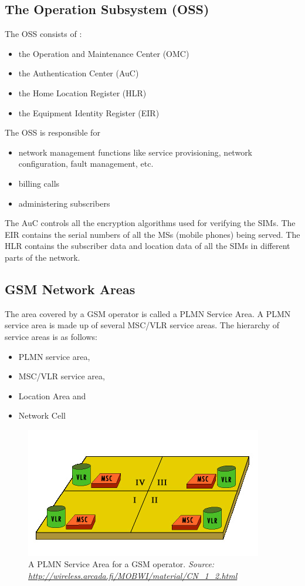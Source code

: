 \subsection{The Operation Subsystem (OSS)}

The OSS consists of :
\begin{itemize}
\item the Operation and Maintenance Center (OMC)
\item the Authentication Center (AuC)
\item the Home Location Register (HLR)
\item the Equipment Identity Register (EIR)
\end{itemize}

The OSS is responsible for
\begin{itemize}
\item network management functions like service provisioning, network configuration, fault management, etc.
\item billing calls
\item administering subscribers
\end{itemize}

The AuC controls all the encryption algorithms used for verifying the SIMs. The EIR contains the serial numbers of all the MSs (mobile phones) being served. The HLR contains the subscriber data and location data of all the SIMs in different parts of the network.

\subsection{GSM Network Areas}

The area covered by a GSM operator is called a PLMN Service Area. A PLMN service area is made up of several MSC/VLR service areas. The hierarchy of service areas is as follows:
\begin{itemize}
\item PLMN service area,
\item MSC/VLR service area,
\item Location Area and
\item Network Cell
\end{itemize}
\begin{figure}
\centering
\includegraphics[scale=0.7]{PLMNServiceArea}
\caption[A PLMN Service Area for a GSM operator]{A PLMN Service Area for a GSM operator.
\emph{Source: \url{http://wireless.arcada.fi/MOBWI/material/CN\_1\_2.html}}}
\end{figure}




